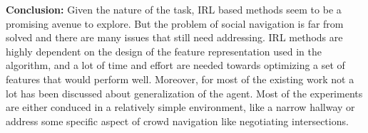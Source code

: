 \textbf{Conclusion:}
Given the nature of the task, IRL based methods seem to be a promising avenue to explore. But the problem of social navigation is far from solved and there are many issues that still need addressing. IRL methods are highly dependent on the design of the feature representation used in the algorithm, and a lot of time and effort are needed towards optimizing a set of features that would perform well. Moreover, for most of the existing work not a lot has been discussed about generalization of the agent. Most of the experiments are either conduced in a relatively simple environment, like a narrow hallway or address some specific aspect of crowd navigation like negotiating intersections. 

